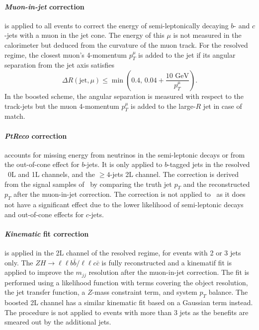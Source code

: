 \paragraph{\textit{Muon-in-jet} correction} is applied to all events to correct the energy of semi-leptonically decaying $b$- and $c$-jets with a muon in the jet cone. The energy of this $\mu$ is not measured in the calorimeter but deduced from the curvature of the muon track. For the resolved regime, the closest muon's 4-momentum $p_T^{\mu}$ is added to the jet if its angular separation from the jet axis satisfies \[\Delta R(\textrm{jet}, \mu) \leq \min\left(0.4, \,0.04 + \frac{10 \textrm{ GeV}}{p_T^{\mu}}\right).\] In the boosted scheme, the angular separation is measured with respect to the track-jets but the muon 4-momentum $p_T^{\mu}$ is added to the large-$R$ jet in case of match.

\paragraph{\textit{PtReco} correction} accounts for missing energy from neutrinos in the semi-leptonic decays or from the out-of-cone effect for $b$-jets. It is only applied to $b$-tagged jets in the resolved \vhb\ 0L and 1L channels, and the $\geq4$-jets 2L channel. The correction is derived from the signal samples of \vhb\ by comparing the truth jet $p_T$ and the reconstructed $p_T$ after the muon-in-jet correction. The correction is not applied to \vhc\ as it does not have a significant effect due to the lower likelihood of semi-leptonic decays and out-of-cone effects for $c$-jets.

\paragraph{\textit{Kinematic} fit correction} is applied in the 2L channel of the resolved regime, for events with 2 or 3 jets only. The $ZH \rightarrow\ell\ell b\bar{b} /\ell\ell c\bar{c}$ is fully reconstructed and a kinematif fit is applied to improve the $m_{jj}$ resolution after the muon-in-jet correction. The fit is performed using a likelihood function with terms covering the object resolution, the jet transfer function, a $Z$-mass constraint term, and system $p_T$ balance. The boosted 2L channel has a similar kinematic fit based on a Gaussian term instead. The procedure is not applied to events with more than 3 jets as the benefits are smeared out by the additional jets. %

